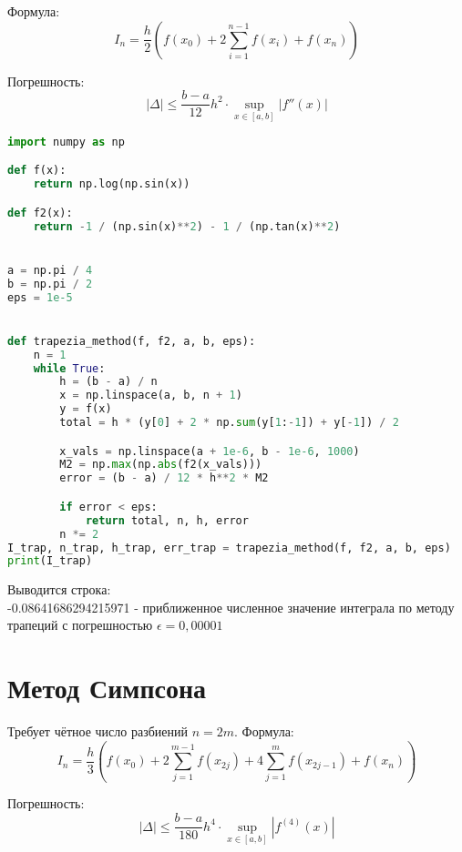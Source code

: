 \documentclass{article}
\begin{document}
Формула:
\[
I_n = \frac{h}{2} \left(f(x_0) + 2 \sum_{i=1}^{n-1} f(x_i) + f(x_n) \right)
\]

Погрешность:
\[
|\Delta| \leq \frac{b - a}{12} h^2 \cdot \sup_{x \in [a,b]} |f''(x)|
\]
\begin{lstlisting}[language=Python]
import numpy as np

def f(x):
    return np.log(np.sin(x))

def f2(x):  
    return -1 / (np.sin(x)**2) - 1 / (np.tan(x)**2)


a = np.pi / 4
b = np.pi / 2
eps = 1e-5


def trapezia_method(f, f2, a, b, eps):
    n = 1
    while True:
        h = (b - a) / n
        x = np.linspace(a, b, n + 1)
        y = f(x)
        total = h * (y[0] + 2 * np.sum(y[1:-1]) + y[-1]) / 2

        x_vals = np.linspace(a + 1e-6, b - 1e-6, 1000)
        M2 = np.max(np.abs(f2(x_vals)))
        error = (b - a) / 12 * h**2 * M2

        if error < eps:
            return total, n, h, error
        n *= 2
I_trap, n_trap, h_trap, err_trap = trapezia_method(f, f2, a, b, eps)
print(I_trap)
\end{lstlisting}
Выводится строка:\\
-0.08641686294215971 - приближенное численное значение интеграла по методу трапеций с погрешностью $\epsilon = 0,00001$

\section*{Метод Симпсона}
Требует чётное число разбиений \( n = 2m \). Формула:
\[
I_n = \frac{h}{3} \left(f(x_0) + 2 \sum_{j=1}^{m-1} f(x_{2j}) + 4 \sum_{j=1}^{m} f(x_{2j - 1}) + f(x_n)\right)
\]

Погрешность:
\[
|\Delta| \leq \frac{b - a}{180} h^4 \cdot \sup_{x \in [a,b]} |f^{(4)}(x)|
\]
\end{document}
